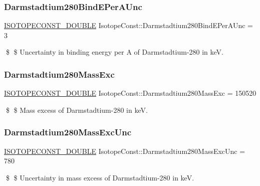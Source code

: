 \subsubsection{\texorpdfstring{Darmstadtium280\+Bind\+E\+Per\+A\+Unc}{Darmstadtium280BindEPerAUnc}}
{\footnotesize\ttfamily \mbox{\hyperlink{group___isotope_const-_macros_ga8f45a7272ce02c0b4c65c44636ed719a}{I\+S\+O\+T\+O\+P\+E\+C\+O\+N\+S\+T\+\_\+\+D\+O\+U\+B\+LE}} Isotope\+Const\+::\+Darmstadtium280\+Bind\+E\+Per\+A\+Unc = 3}

\$ \$ Uncertainty in binding energy per A of Darmstadtium-\/280 in keV. \mbox{\label{group___isotope_const-_darmstadtium-_ds280_ga9783aafdf6e5da751c5b8e1e0ee74782}} 
\subsubsection{\texorpdfstring{Darmstadtium280\+Mass\+Exc}{Darmstadtium280MassExc}}
{\footnotesize\ttfamily \mbox{\hyperlink{group___isotope_const-_macros_ga8f45a7272ce02c0b4c65c44636ed719a}{I\+S\+O\+T\+O\+P\+E\+C\+O\+N\+S\+T\+\_\+\+D\+O\+U\+B\+LE}} Isotope\+Const\+::\+Darmstadtium280\+Mass\+Exc = 150520}

\$ \$ Mass excess of Darmstadtium-\/280 in keV. \mbox{\label{group___isotope_const-_darmstadtium-_ds280_ga00b423a181ef2953e000b408ae34cf21}} 
\subsubsection{\texorpdfstring{Darmstadtium280\+Mass\+Exc\+Unc}{Darmstadtium280MassExcUnc}}
{\footnotesize\ttfamily \mbox{\hyperlink{group___isotope_const-_macros_ga8f45a7272ce02c0b4c65c44636ed719a}{I\+S\+O\+T\+O\+P\+E\+C\+O\+N\+S\+T\+\_\+\+D\+O\+U\+B\+LE}} Isotope\+Const\+::\+Darmstadtium280\+Mass\+Exc\+Unc = 780}

\$ \$ Uncertainty in mass excess of Darmstadtium-\/280 in keV. \mbox{\label{group___isotope_const-_darmstadtium-_ds280_gaaaa11ef853f7b1810275203a6be3bceb}} 
